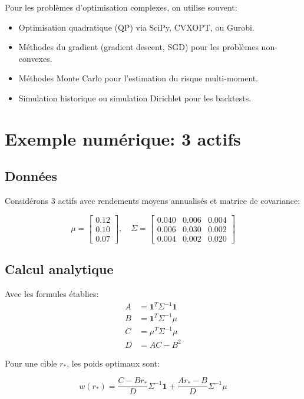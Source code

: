 \documentclass[11pt,a4paper]{article}
\begin{document}
Pour les problèmes d'optimisation complexes, on utilise souvent:
\begin{itemize}
\item Optimisation quadratique (QP) via SciPy, CVXOPT, ou Gurobi.
\item Méthodes du gradient (gradient descent, SGD) pour les problèmes non-convexes.
\item Méthodes Monte Carlo pour l'estimation du risque multi-moment.
\item Simulation historique ou simulation Dirichlet pour les backtests.
\end{itemize}

\section{Exemple numérique: 3 actifs}

\subsection{Données}

Considérons 3 actifs avec rendements moyens annualisés et matrice de covariance:

\[
\mu = \begin{bmatrix} 0.12 \\ 0.10 \\ 0.07 \end{bmatrix}, \quad
\Sigma = \begin{bmatrix}
0.040 & 0.006 & 0.004 \\
0.006 & 0.030 & 0.002 \\
0.004 & 0.002 & 0.020
\end{bmatrix}
\]

\subsection{Calcul analytique}

Avec les formules établies:
\begin{align}
A &= \mathbf{1}^T \Sigma^{-1} \mathbf{1} \\
B &= \mathbf{1}^T \Sigma^{-1} \mu \\
C &= \mu^T \Sigma^{-1} \mu \\
D &= A C - B^2
\end{align}

Pour une cible $r_*$, les poids optimaux sont:

\[
w(r_*) = \frac{C - B r_*}{D} \Sigma^{-1} \mathbf{1} + \frac{A r_* - B}{D} \Sigma^{-1} \mu
\]
\end{document}
